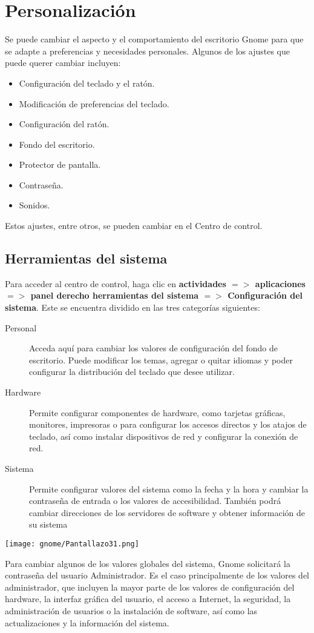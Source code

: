 \chapter{Personalización}
Se puede cambiar el aspecto y el comportamiento del escritorio Gnome para que se adapte a preferencias y necesidades personales. Algunos de los ajustes que puede querer cambiar incluyen:
\begin{itemize}
\item Configuración del teclado y el ratón.
\item Modificación de preferencias del teclado.
\item Configuración del ratón.
\item Fondo del escritorio.
\item Protector de pantalla.
\item Contraseña.
\item Sonidos.
\end{itemize}
Estos ajustes, entre otros, se pueden cambiar en el Centro de control.
\section{Herramientas del sistema}
Para acceder al centro de control, haga clic en {\bf actividades $=>$ aplicaciones $=>$ panel derecho herramientas del sistema $=>$ Configuración del sistema}. Este se encuentra dividido en las tres categorías siguientes:
\begin{description}
\item[Personal] Acceda aquí para cambiar los valores de configuración del fondo de escritorio. Puede modificar los temas, agregar o quitar idiomas y poder configurar la distribución del teclado que desee utilizar.
\item[Hardware] Permite configurar componentes de hardware, como tarjetas gráficas, monitores, impresoras o para configurar los accesos directos y los atajos de teclado, así como instalar dispositivos de red y configurar la conexión de red.
\item[Sistema] Permite configurar valores del sistema como la fecha y la hora y cambiar
la contraseña de entrada o los valores de accesibilidad.
También podrá cambiar direcciones de los servidores de software y obtener información de su sistema 
\end{description}
\begin{center}
\texttt{[image: gnome/Pantallazo31.png]}
\end{center}
Para cambiar algunos de los valores globales del sistema, Gnome solicitará
la contraseña del usuario Administrador. Es el caso principalmente de los
valores del administrador, que incluyen la mayor parte de los valores de configuración
del hardware, la interfaz gráfica del usuario, el acceso a Internet, la seguridad, la
administración de usuarios o la instalación de software, así como las actualizaciones y
la información del sistema.
